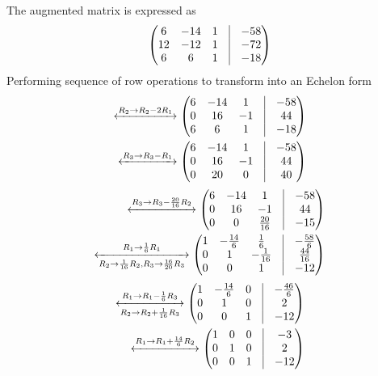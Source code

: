 \documentclass[12pt]{article}
\newcommand{\myvec}[1]{\ensuremath{\begin{pmatrix}#1\end{pmatrix}}}
\begin{document}
\begin{enumerate}
The augmented matrix is expressed as
\begin{align}
	\myvec{6 & -14 & 1 & \vrule & -58 \\ 
	      12 & -12 & 1 & \vrule & -72 \\
	       6 &  6  & 1 & \vrule & -18 
	     }  
\end{align}
Performing sequence of row operations to transform into an Echelon form
\begin{align}
	\xleftrightarrow[]{{R_2\rightarrow R_2-2R_1}}  
	\myvec{6 & -14 & 1 & \vrule & -58 \\ 
	       0 &  16 & -1 & \vrule & 44 \\
	       6 &  6  & 1 & \vrule & -18 
	     }  \\ 
	\xleftrightarrow[]{{R_3\rightarrow R_3-R_1}}  
	\myvec{6 & -14 & 1 & \vrule & -58 \\ 
	       0 &  16 & -1 & \vrule & 44 \\
	       0 &  20  & 0 & \vrule & 40 
	     }  
\end{align}
\begin{align}
	\xleftrightarrow[]{{R_3\rightarrow R_3-\frac{20}{16}R_2}}  
	\myvec{6 & -14 & 1 & \vrule & -58 \\ 
	       0 &  16 & -1 & \vrule & 44 \\
	       0 &  0  &  \frac{20}{16} & \vrule & -15 
	     }  \\ 
	\xleftrightarrow[R_2\rightarrow \frac{1}{16}R_2 \text{,} R_3\rightarrow \frac{16}{20}R_3]{{R_1\rightarrow \frac{1}{6}R_1}}  
	\myvec{1 & -\frac{14}{6} & \frac{1}{6} & \vrule & -\frac{58}{6} \\ 
	       0 &  1 & -\frac{1}{16} & \vrule & \frac{44}{16} \\
	       0 &  0  &  1  & \vrule & -12 
	     }   
\end{align}
\begin{align}
	\xleftrightarrow[R_2\rightarrow R_2+\frac{1}{16}R_3]{{R_1\rightarrow R_1-\frac{1}{6}R_3}}  
	\myvec{1 & -\frac{14}{6} & 0 & \vrule & -\frac{46}{6} \\ 
	       0 &  1 & 0 & \vrule & 2 \\
	       0 &  0  &  1  & \vrule & -12 
	     }  \\ 
	\label{eq:10/7/4/3/Solution}
	\xleftrightarrow[]{{R_1\rightarrow R_1+\frac{14}{6}R_2}}  
	\myvec{1 &  0 & 0 & \vrule & -3\\ 
	       0 &  1 & 0 & \vrule & 2 \\
	       0 &  0 & 1 & \vrule & -12 
	     }  
\end{align}

\end{enumerate}
\end{document}

